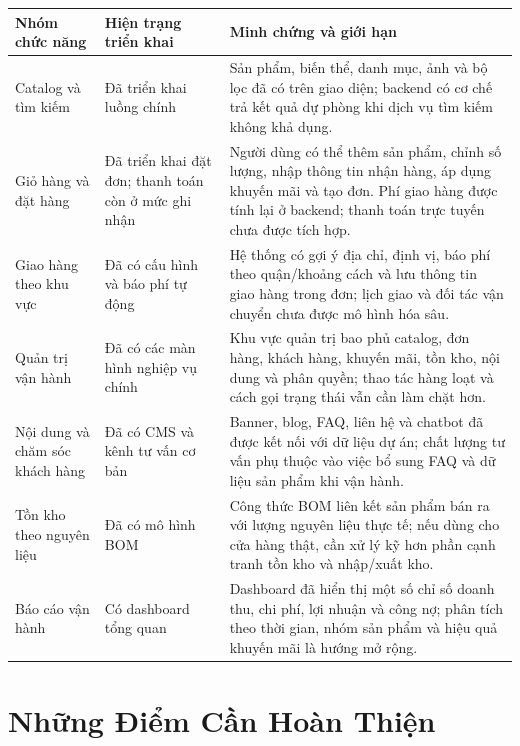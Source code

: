 \begin{longtable}{@{}L{0.27\textwidth} L{0.25\textwidth} L{0.40\textwidth}@{}}
  \toprule
  \textbf{Nhóm chức năng} & \textbf{Hiện trạng triển khai} & \textbf{Minh chứng và giới hạn} \\
  \midrule
  \endhead
  Catalog và tìm kiếm & Đã triển khai luồng chính & Sản phẩm, biến thể, danh mục, ảnh và bộ lọc đã có trên giao diện; backend có cơ chế trả kết quả dự phòng khi dịch vụ tìm kiếm không khả dụng. \\
  Giỏ hàng và đặt hàng & Đã triển khai đặt đơn; thanh toán còn ở mức ghi nhận & Người dùng có thể thêm sản phẩm, chỉnh số lượng, nhập thông tin nhận hàng, áp dụng khuyến mãi và tạo đơn. Phí giao hàng được tính lại ở backend; thanh toán trực tuyến chưa được tích hợp. \\
  Giao hàng theo khu vực & Đã có cấu hình và báo phí tự động & Hệ thống có gợi ý địa chỉ, định vị, báo phí theo quận/khoảng cách và lưu thông tin giao hàng trong đơn; lịch giao và đối tác vận chuyển chưa được mô hình hóa sâu. \\
  Quản trị vận hành & Đã có các màn hình nghiệp vụ chính & Khu vực quản trị bao phủ catalog, đơn hàng, khách hàng, khuyến mãi, tồn kho, nội dung và phân quyền; thao tác hàng loạt và cách gọi trạng thái vẫn cần làm chặt hơn. \\
  Nội dung và chăm sóc khách hàng & Đã có CMS và kênh tư vấn cơ bản & Banner, blog, FAQ, liên hệ và chatbot đã được kết nối với dữ liệu dự án; chất lượng tư vấn phụ thuộc vào việc bổ sung FAQ và dữ liệu sản phẩm khi vận hành. \\
  Tồn kho theo nguyên liệu & Đã có mô hình BOM & Công thức BOM liên kết sản phẩm bán ra với lượng nguyên liệu thực tế; nếu dùng cho cửa hàng thật, cần xử lý kỹ hơn phần cạnh tranh tồn kho và nhập/xuất kho. \\
  Báo cáo vận hành & Có dashboard tổng quan & Dashboard đã hiển thị một số chỉ số doanh thu, chi phí, lợi nhuận và công nợ; phân tích theo thời gian, nhóm sản phẩm và hiệu quả khuyến mãi là hướng mở rộng. \\
  \bottomrule
\end{longtable}

\section{Những Điểm Cần Hoàn Thiện}

